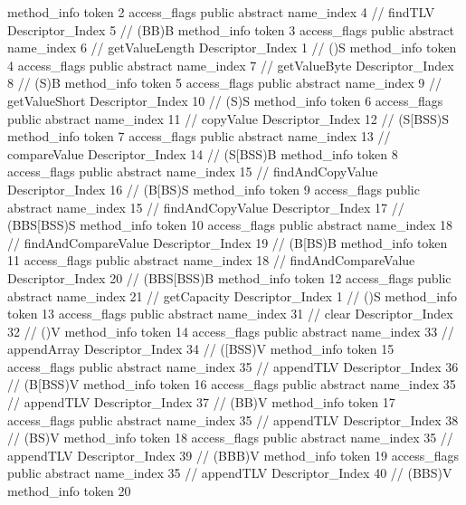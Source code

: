 {{{{				method_info {
					token	2
					access_flags	public abstract
					name_index	4		// findTLV
					Descriptor_Index	5		// (BB)B
				}
				method_info {
					token	3
					access_flags	public abstract
					name_index	6		// getValueLength
					Descriptor_Index	1		// ()S
				}
				method_info {
					token	4
					access_flags	public abstract
					name_index	7		// getValueByte
					Descriptor_Index	8		// (S)B
				}
				method_info {
					token	5
					access_flags	public abstract
					name_index	9		// getValueShort
					Descriptor_Index	10		// (S)S
				}
				method_info {
					token	6
					access_flags	public abstract
					name_index	11		// copyValue
					Descriptor_Index	12		// (S[BSS)S
				}
				method_info {
					token	7
					access_flags	public abstract
					name_index	13		// compareValue
					Descriptor_Index	14		// (S[BSS)B
				}
				method_info {
					token	8
					access_flags	public abstract
					name_index	15		// findAndCopyValue
					Descriptor_Index	16		// (B[BS)S
				}
				method_info {
					token	9
					access_flags	public abstract
					name_index	15		// findAndCopyValue
					Descriptor_Index	17		// (BBS[BSS)S
				}
				method_info {
					token	10
					access_flags	public abstract
					name_index	18		// findAndCompareValue
					Descriptor_Index	19		// (B[BS)B
				}
				method_info {
					token	11
					access_flags	public abstract
					name_index	18		// findAndCompareValue
					Descriptor_Index	20		// (BBS[BSS)B
				}
				method_info {
					token	12
					access_flags	public abstract
					name_index	21		// getCapacity
					Descriptor_Index	1		// ()S
				}
				method_info {
					token	13
					access_flags	public abstract
					name_index	31		// clear
					Descriptor_Index	32		// ()V
				}
				method_info {
					token	14
					access_flags	public abstract
					name_index	33		// appendArray
					Descriptor_Index	34		// ([BSS)V
				}
				method_info {
					token	15
					access_flags	public abstract
					name_index	35		// appendTLV
					Descriptor_Index	36		// (B[BSS)V
				}
				method_info {
					token	16
					access_flags	public abstract
					name_index	35		// appendTLV
					Descriptor_Index	37		// (BB)V
				}
				method_info {
					token	17
					access_flags	public abstract
					name_index	35		// appendTLV
					Descriptor_Index	38		// (BS)V
				}
				method_info {
					token	18
					access_flags	public abstract
					name_index	35		// appendTLV
					Descriptor_Index	39		// (BBB)V
				}
				method_info {
					token	19
					access_flags	public abstract
					name_index	35		// appendTLV
					Descriptor_Index	40		// (BBS)V
				}
				method_info {
					token	20
}}}}}
